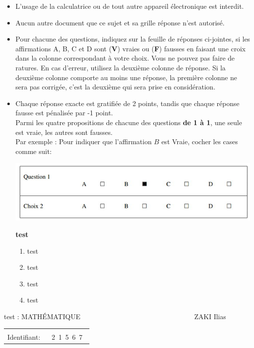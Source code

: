 \documentclass{book}%
\begin{document}
\begin{itemize}%
\item%
L'usage de la calculatrice ou de tout autre appareil électronique est interdit.%
\item%
Aucun autre document que ce sujet et sa grille réponse n'est autorisé.%
\item%
Pour chacune des questions, indiquez sur la feuille de réponses ci-jointes, si les affirmations A, B, C et D sont (\textbf{V}) vraies ou (\textbf{F}) fausses en faisant une croix dans la colonne correspondant à votre choix. Vous ne pouvez pas faire de ratures. En cas d'erreur, utilisez la deuxième colonne de réponse. Si la deuxième colonne comporte au moins une réponse, la première colonne ne sera pas corrigée, c'est la deuxième qui sera prise en considération.%
\item%
Chaque réponse exacte est gratifiée de 2 points, tandis que chaque réponse fausse est pénalisée par -1 point. \\ 	Parmi les quatre propositions de chacune des questions \textbf{de 1 à 1}, une seule est vraie, les autres sont fausses. \\ 	Par exemple : Pour indiquer que l'affirmation $B$ est Vraie, cocher les cases comme suit:  \\ \begin{center}	\includegraphics[scale=0.8]{reponses.png} \end{center}%
\thispagestyle{empty}%
\begin{exercise}%
\textbf{test }%
\begin{enumerate}[label=\textbf{\Alph*. }]%
\item%
test%
\item%
test%
\item%
test%
\item%
test%
\end{enumerate}%
\end{exercise}%
\end{itemize}%
\newpage%
\thispagestyle{empty}%
test : MATHÉMATIQUE $\qquad \qquad \qquad \qquad \qquad \qquad \qquad \qquad$ ZAKI Ilias %
\begin{flushright}%
\begin{tabular}{|l|}%
\hline%
 \\%
\thispagestyle{empty}%
Identifiant: $\quad$ {\Large 2~1~5~6~7~}%
 \\%
\hline%
\end{tabular}%
\end{flushright}%
\end{document}
